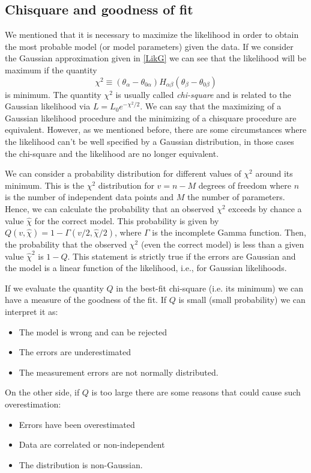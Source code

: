 \documentclass[onecolumn,           %
               showpacs,            %
               preprintnumbers,     %
               aps,                 %
               prl,          	    %
               letterpaper,             %
               superscriptaddress,      %
               nofootinbib,         %
               tightenlines,        %
               floats,floatfix      %
               ,usenatbib,
               ]{revtex4-1}
\begin{document}
\subsection{Chisquare and goodness of fit}

We mentioned that it is necessary to maximize the likelihood in order to obtain the most probable model (or model parameters) given the data. If we consider the Gaussian approximation given in \eqref{LikG} we can see that the likelihood will be maximum if the quantity
\begin{equation}\label{chi2}
\chi^2\equiv(\theta_\alpha-\theta_{0\alpha})H_{\alpha\beta}(\theta_\beta-\theta_{0\beta})
\end{equation}
is minimum. The quantity $\chi^2$ is usually called \textit{chi-square} and is related to the Gaussian likelihood via $L=L_0e^{-\chi^2/2}$. We can say that the maximizing of a Gaussian likelihood procedure and the minimizing of a chisquare procedure are equivalent. However, as we mentioned before, there are some circumstances where the likelihood can't be well specified by a Gaussian distribution, in those cases the chi-square and the likelihood are no longer equivalent. 

We can consider a probability distribution for different values of $\chi^2$ around its minimum. This is the $\chi^2$ distribution for $v=n-M$ degrees of freedom where $n$ is the number of independent data points and $M$ the number of parameters. Hence, we can calculate the probability that an observed $\chi^2$ exceeds by chance a value $\hat \chi$ for the correct model. This probability is given by \cite{NR} $Q(v,\hat\chi)=1-\Gamma(v/2,\hat\chi/2)$, where $\Gamma$ is the incomplete Gamma function. Then, the probability that the observed $\chi^2$ (even the correct model) is less than a given value $\hat\chi^2$ is $1-Q$. This statement is strictly true if the errors are Gaussian and the model is a linear function of the likelihood, i.e., for Gaussian likelihoods.

If we evaluate the quantity $Q$ in the best-fit chi-square (i.e. its minimum) we can have a measure of the goodness of the fit. If $Q$ is small (small probability) we can interpret it as:
\begin{itemize}
\item The model is wrong and can be rejected
\item The errors are underestimated 
\item The measurement errors are not normally distributed.
\end{itemize}
On the other side, if $Q$ is too large there are some reasons that could cause such overestimation:
\begin{itemize}
\item Errors have been overestimated
\item Data are correlated or non-independent
\item The distribution is non-Gaussian.
\end{itemize}
\end{document}

